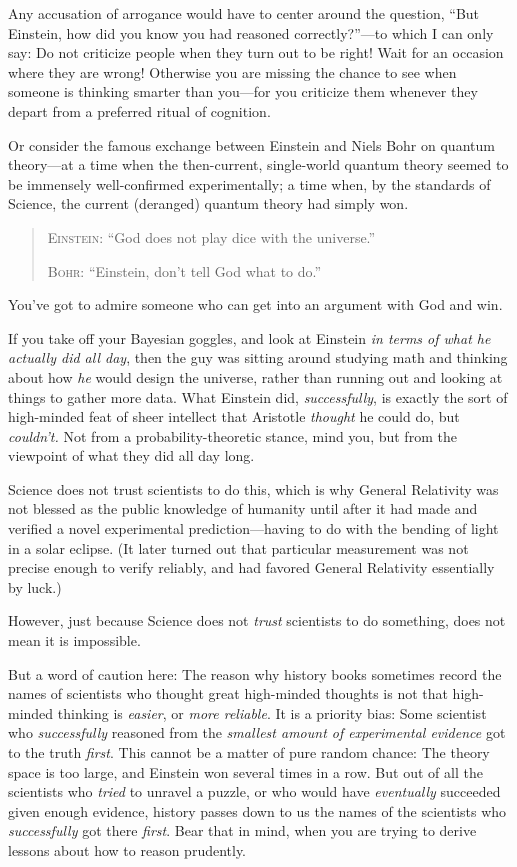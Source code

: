 {
 Any accusation of arrogance would have to center around the
question, ``But Einstein, how did you know you had
reasoned correctly?''---to which I can only say: Do
not criticize people when they turn out to be right! Wait for an
occasion where they are wrong! Otherwise you are missing the chance to
see when someone is thinking smarter than you---for you criticize them
whenever they depart from a preferred ritual of cognition.}

{
 Or consider the famous exchange between Einstein and Niels Bohr on
quantum theory---at a time when the then-current, single-world quantum
theory seemed to be immensely well-confirmed experimentally; a time
when, by the standards of Science, the current (deranged) quantum
theory had simply won.}

\begin{quotation}
{
 \textsc{Einstein}: ``God does not play dice with the
universe.''}

{
 \textsc{Bohr}: ``Einstein, don't tell God
 what to do.''}
\end{quotation}

{
 You've got to admire someone who can get into an
argument with God and win.}

{
 If you take off your Bayesian goggles, and look at Einstein
\textit{in terms of what he actually did all day}, then the guy was
sitting around studying math and thinking about how \textit{he} would
design the universe, rather than running out and looking at things to
gather more data. What Einstein did, \textit{successfully}, is exactly
the sort of high-minded feat of sheer intellect that Aristotle
\textit{thought} he could do, but \textit{couldn't.}
Not from a probability-theoretic stance, mind you, but from the
viewpoint of what they did all day long.}

{
 Science does not trust scientists to do this, which is why General
Relativity was not blessed as the public knowledge of humanity until
after it had made and verified a novel experimental prediction---having
to do with the bending of light in a solar eclipse. (It later turned
out that particular measurement was not precise enough to verify
reliably, and had favored General Relativity essentially by luck.)}

{
 However, just because Science does not \textit{trust} scientists
to do something, does not mean it is impossible.}

{
 But a word of caution here: The reason why history books sometimes
record the names of scientists who thought great high-minded thoughts
is not that high-minded thinking is \textit{easier}, or \textit{more
reliable}. It is a priority bias: Some scientist who
\textit{successfully} reasoned from the \textit{smallest amount of
experimental evidence} got to the truth \textit{first}. This cannot be
a matter of pure random chance: The theory space is too large, and
Einstein won several times in a row. But out of all the scientists who
\textit{tried} to unravel a puzzle, or who would have
\textit{eventually} succeeded given enough evidence, history passes
down to us the names of the scientists who \textit{successfully} got
there \textit{first}. Bear that in mind, when you are trying to derive
lessons about how to reason prudently.}

